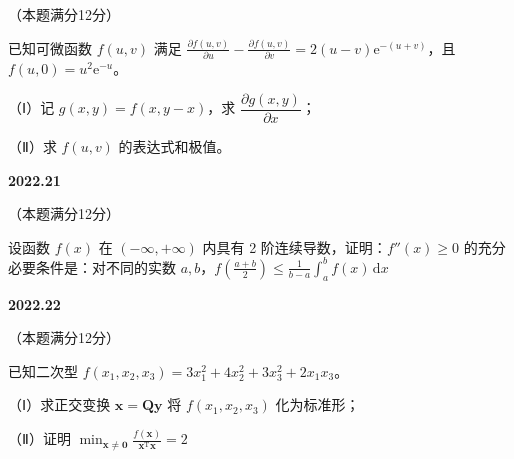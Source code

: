 \documentclass[UTF8,12pt,fontset=windows]{ctexart}
\begin{document}
（本题满分12分）

已知可微函数 $f(u,v)$ 满足 $\frac{\partial f(u,v)}{\partial u} - \frac{\partial f(u,v)}{\partial v} = 2(u-v)\mathrm{e}^{-(u+v)}$，且 $f(u,0) = u^2\mathrm{e}^{-u}$。

（Ⅰ）记 $g(x,y) = f(x, y-x)$，求 $\dfrac{\partial g(x,y)}{\partial x}$；

（Ⅱ）求 $f(u,v)$ 的表达式和极值。

\vfill
\newpage
{\large\bfseries 2022.21}

（本题满分12分）

设函数 $f(x)$ 在 $(-\infty, +\infty)$ 内具有 2 阶连续导数，证明：$f''(x) \geqslant 0$ 的充分必要条件是：对不同的实数 $a, b$，$f\left(\frac{a+b}{2}\right) \leqslant \frac{1}{b-a}\int_{a}^{b} f(x)\,\mathrm{d}x$

\vfill
\newpage
{\large\bfseries 2022.22}

（本题满分12分）

已知二次型 $f(x_1, x_2, x_3) = 3x_1^2 + 4x_2^2 + 3x_3^2 + 2x_1x_3$。

（Ⅰ）求正交变换 $\boldsymbol{x} = \boldsymbol{Q}\boldsymbol{y}$ 将 $f(x_1, x_2, x_3)$ 化为标准形；

（Ⅱ）证明 $\min_{\boldsymbol{x} \neq \boldsymbol{0}}\frac{f(\boldsymbol{x})}{\boldsymbol{x}^{\mathrm{T}}\boldsymbol{x}} = 2$

\vfill
\end{document}
